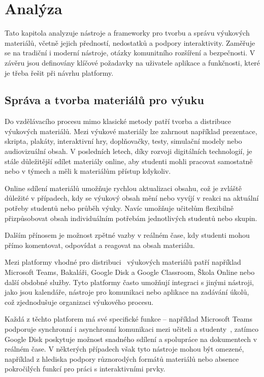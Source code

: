 \chapter{Analýza}

\begin{chapterabstract}
Tato kapitola analyzuje nástroje a frameworky pro tvorbu a správu výukových materiálů, včetně jejich předností, nedostatků a podpory interaktivity. Zaměřuje se na tradiční i moderní nástroje, otázky komunitního rozšíření a bezpečnosti. V závěru jsou definovány klíčové požadavky na uživatele aplikace a funkčnosti, které je třeba řešit při návrhu platformy.
\end{chapterabstract}


\section{Správa a tvorba materiálů pro výuku}


Do vzdělávacího procesu mimo klasické metody patří tvorba a distribuce výukových materiálů.
Mezi výukové materiály lze zahrnout například prezentace, skripta, plakáty, interaktivní hry, doplňovačky, testy, simulační modely nebo audiovizuální obsah.
V posledních letech, díky rozvoji digitálních technologií, je stále důležitější sdílet materiály online, aby studenti mohli pracovat samostatně nebo v týmech a měli k materiálům přístup kdykoliv.

Online sdílení materiálů umožňuje rychlou aktualizaci obsahu, což je zvláště důležité v případech, kdy se výukový obsah mění nebo vyvíjí v reakci na aktuální potřeby studentů nebo průběh výuky.
Navíc umožňuje učitelům flexibilně přizpůsobovat obsah individuálním potřebám jednotlivých studentů nebo skupin.

Dalším přínosem je možnost zpětné vazby v reálném čase, kdy studenti mohou přímo komentovat, odpovídat a reagovat na obsah materiálu.

Mezi platformy vhodné pro distribuci~\cite{msmt_aplikace} výukových materiálů patří například Microsoft Teams, Bakaláři, Google Disk a Google Classroom, Škola Online nebo další obdobné služby.
Tyto platformy často umožňují integraci s jinými nástroji, jako jsou kalendáře, nástroje pro komunikaci nebo aplikace na zadávání úkolů, což zjednodušuje organizaci výukového procesu.

Každá z těchto platforem má své specifické funkce -- například Microsoft Teams podporuje synchronní i asynchronní komunikaci mezi učiteli a studenty~\cite{teams}, zatímco Google Disk poskytuje možnost snadného sdílení a spolupráce na dokumentech v reálném čase.
V některých případech však tyto nástroje mohou být omezené, například z hlediska podpory různorodých formátů materiálů nebo absence pokročilých funkcí pro práci s interaktivními prvky.

